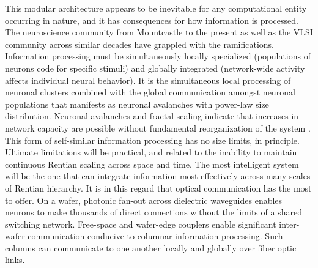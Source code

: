 \documentclass[twocolumn]{article}
\begin{document}
This modular architecture appears to be inevitable for any computational entity occurring in nature, and it has consequences for how information is processed. The neuroscience community from Mountcastle to the present as well as the VLSI community across similar decades have grappled with the ramifications. Information processing must be simultaneously locally specialized (populations of neurons code for specific stimuli) and globally integrated (network-wide activity affects individual neural behavior). It is the simultaneous local processing of neuronal clusters combined with the global communication amongst neuronal populations that manifests as neuronal avalanches with power-law size distribution. Neuronal avalanches and fractal scaling indicate that increases in network capacity are possible without fundamental reorganization of the system \cite{peth2009}. This form of self-similar information processing has no size limits, in principle. Ultimate limitations will be practical, and related to the inability to maintain continuous Rentian scaling across space and time. The most intelligent system will be the one that can integrate information most effectively across many scales of Rentian hierarchy. It is in this regard that optical communication has the most to offer. On a wafer, photonic fan-out across dielectric waveguides enables neurons to make thousands of direct connections without the limits of a shared switching network. Free-space and wafer-edge couplers enable significant inter-wafer communication conducive to columnar information processing. Such columns can communicate to one another locally and globally over fiber optic links.
\end{document}
